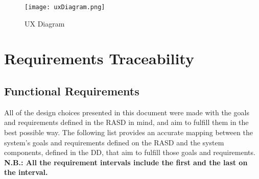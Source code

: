 \documentclass[12pt]{article}
\begin{document}
\begin{figure}[H]
    \centering
    \texttt{[image: uxDiagram.png]}
    \caption{UX Diagram}
    \label{fig:uxDiagram}
\end{figure}

\section{Requirements Traceability}
\subsection{Functional Requirements}
All of the design choices presented in this document were made with the goals and requirements defined in the RASD in mind, and aim to fulfill them in the best possible way. The following list provides an accurate mapping between the system's goals and requirements defined on the RASD and the system components, defined in the DD, that aim to fulfill those goals and requirements.\\
\textbf{N.B.: All the requirement intervals include the first and the last on the interval.}
\end{document}
